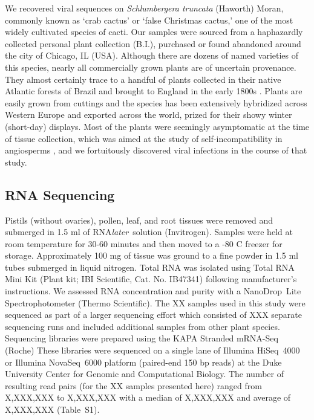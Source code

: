 \documentclass[fleqn,10pt,lineno]{wlpeerj}
\begin{document}
We recovered viral sequences on \textit{Schlumbergera truncata} (Haworth) Moran, commonly known as `crab cactus' or `false Christmas cactus,' one of the most widely cultivated species of cacti. 
Our samples were sourced from a haphazardly collected personal plant collection (B.I.), purchased or found abandoned around the city of Chicago, IL (USA). 
Although there are dozens of named varieties of this species, nearly all commercially grown plants are of uncertain provenance. 
They almost certainly trace to a handful of plants collected in their native Atlantic forests of Brazil and brought to England in the early 1800s \citep{boyle2003}. 
Plants are easily grown from cuttings and the species has been extensively hybridized across Western Europe and exported across the world, prized for their showy winter (short-day) displays.
Most of the plants were seemingly asymptomatic at the time of tissue collection, which was aimed at the study of self-incompatibility in angiosperms \citep{ramanauskas2021}, and we fortuitously discovered viral infections in the course of that study.


\subsection*{RNA Sequencing}

Pistils (without ovaries), pollen, leaf, and root tissues were removed and submerged in 1.5 ml of RNA\textit{later}\texttrademark~solution (Invitrogen).
Samples were held at room temperature for 30-60 minutes and then moved to a -80 C freezer for storage.
Approximately 100 mg of tissue was ground to a fine powder in 1.5 ml tubes submerged in liquid nitrogen.
Total RNA was isolated using Total RNA Mini Kit (Plant kit; IBI Scientific, Cat. No. IB47341) following manufacturer's instructions.
We assessed RNA concentration and purity with a NanoDrop\texttrademark~Lite Spectrophotometer (Thermo Scientific).
The XX samples used in this study were sequenced as part of a larger sequencing effort which consisted of XXX separate sequencing runs and included additional samples from other plant species.
Sequencing libraries were prepared using the KAPA Stranded mRNA-Seq (Roche)
These libraries were sequenced on a single lane of Illumina \mbox{HiSeq}~4000 or Illumina \mbox{NovaSeq}~6000 platform (paired-end 150 bp reads) at the Duke University Center for Genomic and Computational Biology.
The number of resulting read pairs (for the XX samples presented here) ranged from X,XXX,XXX to X,XXX,XXX with a median of X,XXX,XXX and average of X,XXX,XXX (Table~S1).
\end{document}
